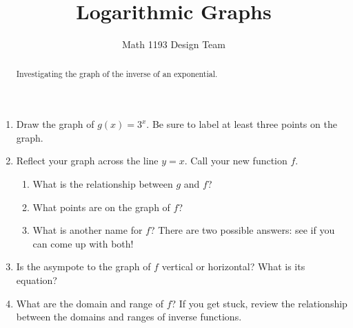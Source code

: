 \documentclass[noauthor]{ximera}
\title{Logarithmic Graphs}
\author{Math 1193 Design Team}
\begin{document}
\begin{abstract}
    Investigating the graph of the inverse of an exponential.
\end{abstract}
\maketitle

\begin{enumerate}
    \item Draw the graph of \(g(x) = 3^x\). Be sure to label at least
    three points on the graph.
    \item Reflect your graph across the line \(y = x\). Call your new
    function \(f\).
    \begin{enumerate}
        \item What is the relationship between \(g\) and \(f\)?
        \item What points are on the graph of \(f\)?
        \item What is another name for \(f\)? There are two possible answers:
        see if you can come up with both!
    \end{enumerate}
    \item Is the asympote to the graph of \(f\) vertical or horizontal?
    What is its equation?
    \item What are the domain and range of \(f\)? If you get
    stuck, review the relationship between the domains and 
    ranges of inverse functions.
    
\end{enumerate}
\end{document}
